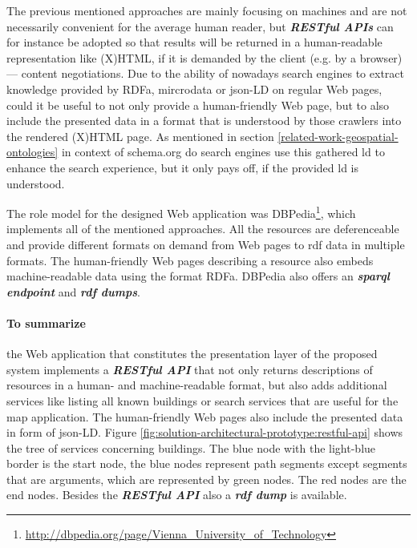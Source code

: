 \documentclass[draft,final]{vutinfth} %
\begin{document}
The previous mentioned approaches are mainly focusing on machines and are not necessarily convenient for the average human reader, but \textit{\textbf{RESTful APIs}} can for instance be adopted so that results will be returned in a human-readable representation like (X)HTML, if it is demanded by the client (e.g. by a browser) --- content negotiations. Due to the ability of nowadays search engines to extract knowledge provided by RDFa, mircrodata or \gls{json}-LD on regular Web pages, could it be useful to not only provide a human-friendly Web page, but to also include the presented data in a format that is understood by those crawlers into the rendered (X)HTML page. As mentioned in section \ref{related-work-geospatial-ontologies} in context of schema.org do search engines use this gathered \gls{ld} to enhance the search experience, but it only pays off, if the provided \gls{ld} is understood.

The role model for the designed Web application was DBPedia\footnote{\url{http://dbpedia.org/page/Vienna_University_of_Technology}}, which implements all of the mentioned approaches. All the resources are deferenceable and provide different formats on demand from Web pages to \gls{rdf} data in multiple formats. The human-friendly Web pages describing a resource also embeds machine-readable data using the format RDFa. DBPedia also offers an \textit{\textbf{\gls{sparql} endpoint}} and \textit{\textbf{\gls{rdf} dumps}}.

\paragraph{To summarize} the Web application that constitutes the presentation layer of the proposed system implements a \textit{\textbf{RESTful API}} that not only returns descriptions of resources in a human- and machine-readable format, but also adds additional services like listing all known buildings or search services that are useful for the map application. The human-friendly Web pages also include the presented data in form of \gls{json}-LD. Figure \ref{fig:solution-architectural-prototype:restful-api} shows the tree of services concerning buildings. The blue node with the light-blue border is the start node, the blue nodes represent path segments except segments that are arguments, which are represented by green nodes. The red nodes are the end nodes.  Besides the \textit{\textbf{RESTful API}} also a \textit{\textbf{\gls{rdf} dump}} is available.
\end{document}
